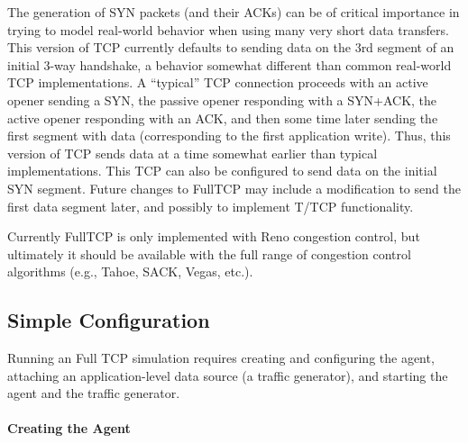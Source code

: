 The generation of SYN packets (and their ACKs) can be
of critical importance in trying to model real-world behavior
when using many very short data transfers.
This version of TCP currently defaults to sending
data on the 3rd segment of an initial 3-way handshake, a behavior
somewhat different than common real-world TCP implementations.
A ``typical'' TCP connection proceeds with an active opener
sending a SYN, the passive opener responding with a SYN+ACK,
the active opener responding with an ACK, and then some time later
sending the first segment with data (corresponding to the first
application write).
Thus, this version of TCP sends data at a time somewhat earlier
than typical implementations.
This TCP can also be configured to send data on the initial SYN
segment.
Future changes to FullTCP may include a modification to send the
first data segment later, and possibly to implement T/TCP functionality.

Currently FullTCP is only implemented with Reno congestion control,
but ultimately it should be available with the full range of
congestion control algorithms (e.g., Tahoe, SACK, Vegas, etc.).


\subsection{Simple Configuration}
\label{sec:simpleconfig}
Running an Full TCP simulation requires
creating and configuring the agent,
attaching an application-level data source (a traffic generator), and
starting the agent and the traffic generator.

\paragraph{Creating the Agent}

